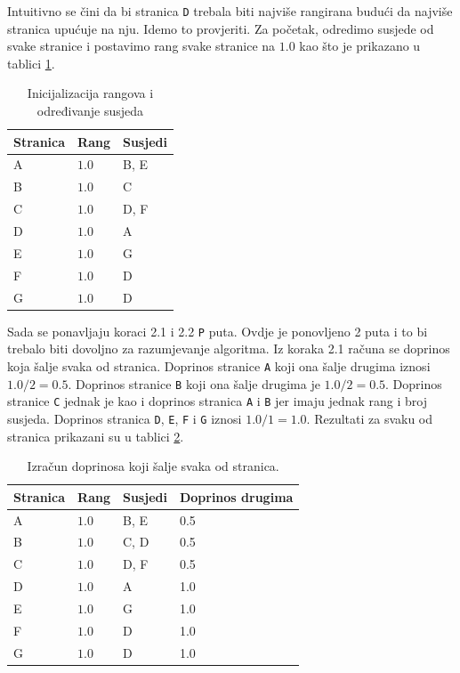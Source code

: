 \documentclass[times, utf8, zavrsni, numeric]{fer}
\begin{document}
Intuitivno se čini da bi stranica \texttt{D} trebala biti najviše rangirana budući da najviše stranica upućuje na nju. Idemo to provjeriti. Za početak, odredimo susjede od svake stranice i postavimo rang svake stranice na $1.0$ kao što je prikazano u tablici \ref{tbl:pageRankKorak1}.
\pagebreak
\begin{table}[htb]
\caption{Inicijalizacija rangova i određivanje susjeda}
\label{tbl:pageRankKorak1}
\centering
\begin{tabular}{lll} 
\hline
Stranica & Rang & Susjedi \\
\hline
A & $1.0$ & B, E\\
B & $1.0$ & C\\
C & $1.0$ & D, F\\
D & $1.0$ & A\\
E & $1.0$ & G\\
F & $1.0$ & D\\
G & $1.0$ & D\\
\hline
\end{tabular}
\end{table}

Sada se ponavljaju koraci 2.1 i 2.2 \texttt{P} puta. Ovdje je ponovljeno 2 puta i to bi trebalo biti dovoljno za razumjevanje algoritma.
Iz koraka 2.1 računa se doprinos koja šalje svaka od stranica. Doprinos stranice \texttt{A} koji ona šalje drugima iznosi $1.0 / 2 = 0.5$. Doprinos stranice \texttt{B} koji ona šalje drugima je $1.0 / 2 = 0.5$. Doprinos stranice \texttt{C} jednak je kao i doprinos stranica \texttt{A} i \texttt{B} jer imaju jednak rang i broj susjeda. Doprinos stranica \texttt{D}, \texttt{E}, \texttt{F} i \texttt{G} iznosi $1.0 / 1 = 1.0$. Rezultati za svaku od stranica prikazani su u tablici \ref{tbl:pageRankKorak21p1}.

\begin{table}[htb]
\caption{Izračun doprinosa koji šalje svaka od stranica.}
\label{tbl:pageRankKorak21p1}
\centering
\begin{tabular}{llll} 
\hline
Stranica & Rang & Susjedi & Doprinos drugima\\
\hline
A & $1.0$ & B, E & 0.5\\
B & $1.0$ & C, D & 0.5\\
C & $1.0$ & D, F & 0.5\\
D & $1.0$ & A & 1.0\\
E & $1.0$ & G & 1.0\\
F & $1.0$ & D & 1.0\\
G & $1.0$ & D & 1.0\\
\hline
\end{tabular}
\end{table}
\end{document}
